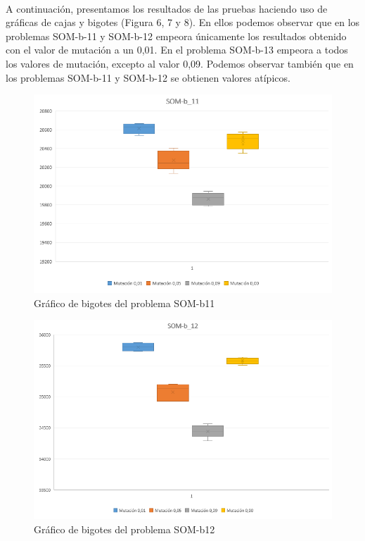 	\paragraph{}A continuación, presentamos los resultados de las pruebas haciendo uso de gráficas de cajas y bigotes (Figura 6, 7 y 8). En ellos podemos observar que en los problemas SOM-b-11 y SOM-b-12 empeora únicamente los resultados obtenido con el valor de mutación a un 0,01. En el problema SOM-b-13 empeora a todos los valores de mutación, excepto al valor 0,09. Podemos observar también que en los problemas SOM-b-11 y SOM-b-12 se obtienen valores atípicos.
	
	\begin{figure}[H]
		
		\centering
		\includegraphics[scale=0.65]{img/BigotesMutacion0_SOM_1}
		\caption{Gráfico de bigotes del problema SOM-b11}
	\end{figure}
	\begin{figure}[H]
		
		\centering
		\includegraphics[scale=0.65]{img/BigotesMutacion0_SOM_2}
		\caption{Gráfico de bigotes del problema SOM-b12}
		
	\end{figure}
